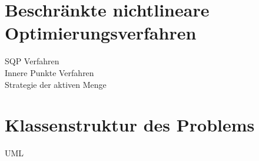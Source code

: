 



\section{Beschränkte nichtlineare Optimierungsverfahren}
SQP Verfahren \\
Innere Punkte Verfahren \\
Strategie der aktiven Menge



\section{Klassenstruktur des Problems}

UML

